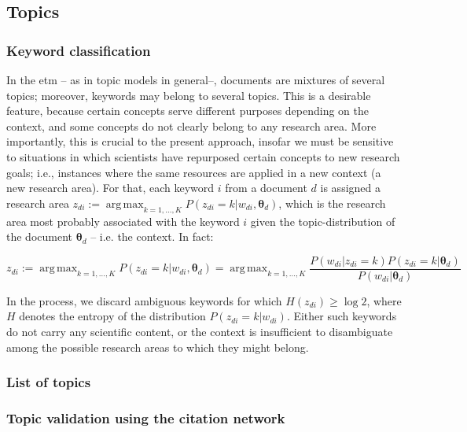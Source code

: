 \documentclass{article}
\DeclareMathOperator*{\argmax}{arg\,max}
\begin{document}
\subsection{\label{appendix:topics}Topics}

\subsubsection{\label{appendix:keywords}Keyword classification}

In the \gls{etm} -- as in topic models in general--, documents are mixtures of several topics; moreover, keywords may belong to several topics. This is a desirable feature, because certain concepts serve different purposes depending on the context, and some concepts do not clearly belong to any research area. More importantly, this is crucial to the present approach, insofar we must be sensitive to situations in which scientists have repurposed certain concepts to new research goals; i.e., instances where the same resources are applied in a new context (a new research area). %
For that, each keyword $i$ from a document $d$ is assigned a research area $z_{di} := \argmax_{k=1,\dots,K} P(z_{di}=k|w_{di},\bm{\theta}_{d})$, which is the research area most probably associated with the keyword $i$ given the topic-distribution of the document $\bm{\theta}_d$ -- i.e. the context. In fact:

\begin{equation}
    z_{di} := \argmax_{k=1,\dots,K} P(z_{di}=k|w_{di},\bm{\theta}_{d}) =  \argmax_{k=1,\dots,K} \dfrac{P(w_{di}|z_{di}=k)P(z_{di}=k|\bm{\theta}_d)}{P(w_{di}|\bm{\theta}_d)}
\end{equation}

In the process, we discard ambiguous keywords for which $H(z_{di})\geq \log{2}$, where $H$ denotes the entropy of the distribution $P(z_{di}=k|w_{di})$. Either such keywords do not carry any scientific content, or the context is insufficient to disambiguate among the possible research areas to which they might belong.

\subsubsection{List of topics}

\fontsize{6}{7}\selectfont\normalsize

\subsubsection{\label{appendix:citation_validation}Topic validation using the citation network}
\end{document}
